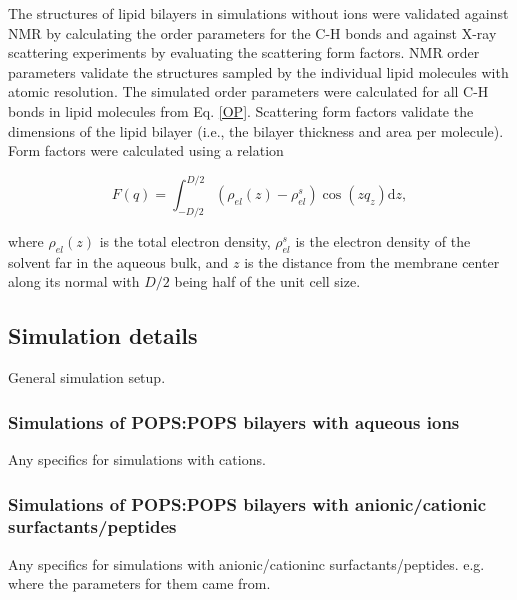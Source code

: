 \documentclass[journal=jpcbfk,manuscript=article]{achemso}
\begin{document}
The structures of lipid bilayers in simulations without ions were validated against NMR by calculating the order parameters for the C-H bonds and against \mbox{X-ray} scattering experiments by evaluating the scattering form factors. 
NMR order parameters validate the structures sampled by the individual lipid molecules with atomic resolution. 
The simulated order parameters were calculated for all C-H bonds in lipid molecules from Eq. \ref{OP}.
Scattering form factors validate the dimensions of the lipid bilayer (i.e., the bilayer thickness and area per molecule). Form factors were calculated using a relation 
 
\begin{equation} 
  F(q) = \int _{-D/2} ^{D/2} \left ( \rho_{el}(z) - \rho_{el}^s \right ) \cos (zq_z) \mathrm{d}z, 
\end{equation} 
 
\noindent where $\rho_{el} (z)$ is the total electron density, $\rho_{el}^s$ is the electron density of the solvent far in the aqueous bulk, and $z$ is the distance from the membrane center along its normal with $D/2$ being half of the unit cell size.   

 
 
 
 
\subsection{Simulation details} 

General simulation setup.
 
\subsubsection{Simulations of POPS:POPS bilayers with aqueous ions} 

Any specifics for simulations with cations.
 
 
 
\subsubsection{Simulations of POPS:POPS bilayers with anionic/cationic surfactants/peptides} 

Any specifics for simulations with anionic/cationinc surfactants/peptides. 
e.g. where the parameters for them came from. 
\end{document}
